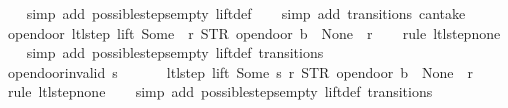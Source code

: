 \begin{isabellebody}
\ \ \isamarkupfalse%
\ {\isacharparenleft}simp\ add{\isacharcolon}\ possible{\isacharunderscore}steps{\isacharunderscore}empty\ lift{\isacharunderscore}def{\isacharparenright}\isanewline
\ \ \isamarkupfalse%
\ {\isacharparenleft}simp\ add{\isacharcolon}\ transitions\ can{\isacharunderscore}take{\isacharparenright}%
\endisatagproof
{\isafoldproof}%
%
\isadelimproof
\isanewline
%
\endisadelimproof
\isanewline
{}\isamarkupfalse%
\ opendoor{\isacharunderscore}{}{\isacharcolon}\ {\isachardoublequoteopen}ltl{\isacharunderscore}step\ lift\ {\isacharparenleft}Some\ {}{\isacharparenright}\ r\ {\isacharparenleft}STR\ {\isacharprime}{\isacharprime}opendoor{\isacharprime}{\isacharprime}{\isacharcomma}\ b{\isacharparenright}\ {\isacharequal}\ {\isacharparenleft}None{\isacharcomma}\ {\isacharbrackleft}{\isacharbrackright}{\isacharcomma}\ r{\isacharparenright}{\isachardoublequoteclose}\isanewline
%
\isadelimproof
\ \ %
\endisadelimproof
%
\isatagproof
{}\isamarkupfalse%
\ {\isacharparenleft}rule\ ltl{\isacharunderscore}step{\isacharunderscore}none{\isacharparenright}\isanewline
\ \ \isamarkupfalse%
\ {\isacharparenleft}simp\ add{\isacharcolon}\ possible{\isacharunderscore}steps{\isacharunderscore}empty\ lift{\isacharunderscore}def\ transitions{\isacharparenright}%
\endisatagproof
{\isafoldproof}%
%
\isadelimproof
\isanewline
%
\endisadelimproof
\isanewline
{}\isamarkupfalse%
\ opendoor{\isacharunderscore}invalid{\isacharcolon}\ {\isachardoublequoteopen}s\ {\isasymnotin}\ {\isacharbraceleft}{}{\isacharcomma}\ {}{\isacharcomma}\ {}{\isacharcomma}\ {}{\isacharbraceright}\ {\isasymLongrightarrow}\ ltl{\isacharunderscore}step\ lift\ {\isacharparenleft}Some\ s{\isacharparenright}\ r\ {\isacharparenleft}STR\ {\isacharprime}{\isacharprime}opendoor{\isacharprime}{\isacharprime}{\isacharcomma}\ b{\isacharparenright}\ {\isacharequal}\ {\isacharparenleft}None{\isacharcomma}\ {\isacharbrackleft}{\isacharbrackright}{\isacharcomma}\ r{\isacharparenright}{\isachardoublequoteclose}\isanewline
%
\isadelimproof
\ \ %
\endisadelimproof
%
\isatagproof
{}\isamarkupfalse%
\ {\isacharparenleft}rule\ ltl{\isacharunderscore}step{\isacharunderscore}none{\isacharparenright}\isanewline
\ \ \isamarkupfalse%
\ {\isacharparenleft}simp\ add{\isacharcolon}\ possible{\isacharunderscore}steps{\isacharunderscore}empty\ lift{\isacharunderscore}def\ transitions{\isacharparenright}%
\endisatagproof
{\isafoldproof}%

\end{isabellebody}

